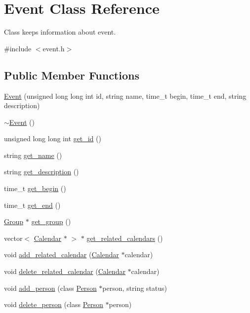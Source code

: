 \hypertarget{classEvent}{
\section{Event Class Reference}
\label{d5/da5/classEvent}
}


Class keeps information about event.  




{\ttfamily \#include $<$event.h$>$}

\subsection*{Public Member Functions}
\begin{DoxyCompactItemize}
\item 
\hyperlink{classEvent_a6210fee3f753d5c550a00f1e4f5a971d}{Event} (unsigned long long int id, string name, time\_\-t begin, time\_\-t end, string description)
\item 
\hyperlink{classEvent_a7704ec01ce91e673885792054214b3d2}{$\sim$Event} ()
\item 
unsigned long long int \hyperlink{classEvent_a089064adeae9dcdbb53483417924939c}{get\_\-id} ()
\item 
string \hyperlink{classEvent_a99325a5304e3b73cd4df1f356a185cfc}{get\_\-name} ()
\item 
string \hyperlink{classEvent_a07fdb4a55424b028bfb64db3cea94c07}{get\_\-description} ()
\item 
time\_\-t \hyperlink{classEvent_aa0177bde2838d761774f6e9a50f1e76c}{get\_\-begin} ()
\item 
time\_\-t \hyperlink{classEvent_a25baaf84cc87da4b866f266f946c1d8f}{get\_\-end} ()
\item 
\hyperlink{classGroup}{Group} $\ast$ \hyperlink{classEvent_a5736ec29101416a0358b709c964bf50d}{get\_\-group} ()
\item 
vector$<$ \hyperlink{classCalendar}{Calendar} $\ast$ $>$ $\ast$ \hyperlink{classEvent_ab2329f2021caee686920d5ab2cfa8569}{get\_\-related\_\-calendars} ()
\item 
void \hyperlink{classEvent_a1d59dc31b3358bb9d9d1e75cb735c6ef}{add\_\-related\_\-calendar} (\hyperlink{classCalendar}{Calendar} $\ast$calendar)
\item 
void \hyperlink{classEvent_ac4bc91dab8ca340c58aed7c91a8376a7}{delete\_\-related\_\-calendar} (\hyperlink{classCalendar}{Calendar} $\ast$calendar)
\item 
void \hyperlink{classEvent_a77077d8d27027113b2e20b4374a00a61}{add\_\-person} (class \hyperlink{classPerson}{Person} $\ast$person, string status)
\item 
void \hyperlink{classEvent_a5e071ee79b9ac9520fa5f26d763ce662}{delete\_\-person} (class \hyperlink{classPerson}{Person} $\ast$person)
\end{DoxyCompactItemize}


